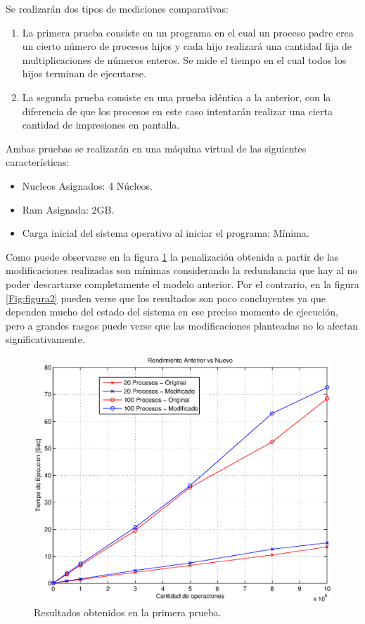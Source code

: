 \documentclass[a4paper]{book}
\begin{document}
Se realizar\'an dos tipos de mediciones comparativas:
\begin{enumerate}
\item La primera prueba consiste en un programa en el cual un proceso padre crea un cierto n\'umero de procesos hijos y cada hijo realizar\'a una cantidad fija de multiplicaciones de n\'umeros enteros. Se mide el tiempo en el cual todos los hijos terminan de ejecutarse.
\item La segunda prueba consiste en una prueba id\'entica a la anterior, con la diferencia de que los procesos en este caso intentar\'an realizar una cierta cantidad de impresiones en pantalla.
\end{enumerate}

Ambas pruebas se realizar\'an en una m\'aquina virtual de las siguientes caracter\'isticas:
\begin{itemize}
\item Nucleos Asignados: 4 N\'ucleos.
\item Ram Asignada: 2GB.
\item Carga inicial del sistema operativo al iniciar el programa: M\'inima.
\end{itemize}

Como puede observarse en la figura \ref{Fig:figura1} la penalizaci\'on obtenida a partir de las modificaciones realizadas son m\'inimas considerando la redundancia que hay al no poder descartarse completamente el modelo anterior. Por el contrario, en la figura \ref{Fig:figura2} pueden verse que los resultados son poco concluyentes ya que dependen mucho del estado del sistema en ese preciso momento de ejecuci\'on, pero a grandes rasgos puede verse que las modificaciones planteadas no lo afectan significativamente.

\begin{figure}
\begin{center}
	\includegraphics[scale=0.7]{./imagenes/prueba1.eps}
	\caption{Resultados obtenidos en la primera prueba.}
	\label{Fig:figura1}
\end{center}
\end{figure}
\end{document}
